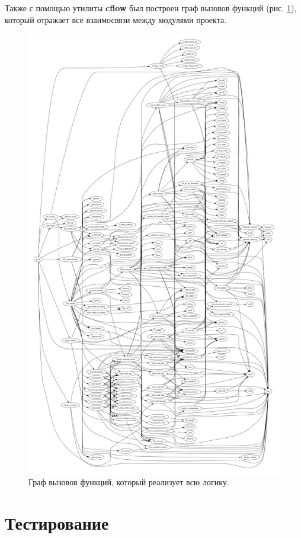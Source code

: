 \documentclass[a4paper,12pt]{report}
\begin{document}
	Также с помощью утилиты \textbf{cflow} был построен граф вызовов функций (рис. \ref{fig:cflow}), который отражает все взаимосвязи между модулями проекта.
	
	\begin{figure}[H]
	\centering
	\includegraphics[width=\textwidth]{./include/cflow.pdf}
	\caption{Граф вызовов функций, который реализует всю логику.}
	\label{fig:cflow}
	\end{figure}

	\section{Тестирование}
	
\end{document}
